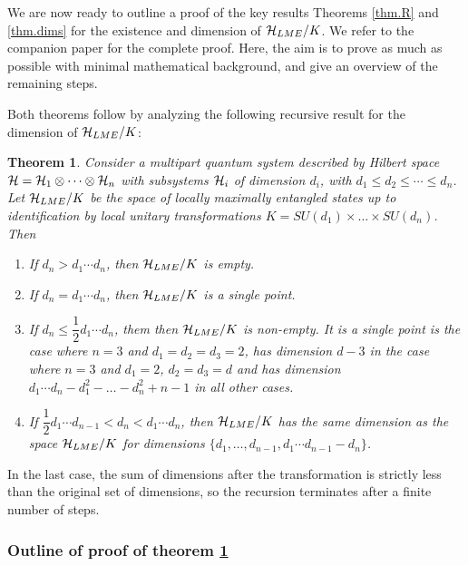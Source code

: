 \documentclass[12pt]{article}
\newtheorem{theorem}{Theorem}[section]
\theoremstyle{definition}
\begin{document}
We are now ready to outline a proof of the key results Theorems \ref{thm.R} and \ref{thm.dims} for the existence and dimension of ${\cal H}_{LME}/K$. We refer to the companion paper \cite{mathpaper} for the complete proof. Here, the aim is to prove as much as possible with minimal mathematical background, and give an overview of the remaining steps.

Both theorems follow by analyzing the following recursive result for the dimension of ${\cal H}_{LME}/K$:

\begin{theorem}\label{thm.States}
Consider a multipart quantum system described by Hilbert space ${\cal H} = {\cal H}_1  \otimes \cdots  \otimes {\cal H}_n$ with subsystems ${\cal H}_i$ of dimension $d_i$, with  $d_1 \le d_2 \leqslant \cdots \leqslant d_n$. Let ${\cal H}_{LME}/K$ be the space of locally maximally entangled states up to identification by local unitary transformations $K = SU(d_1) \times \dots \times SU(d_n)$. Then
\begin{enumerate}

\item
If $d_n > d_1 \cdots d_n$, then ${\cal H}_{LME}/K$ is empty.

\item
If $d_n = d_1 \cdots d_n$, then ${\cal H}_{LME}/K$ is a single point.

\item
If $d_n \le \dfrac{1}{2} d_1 \cdots d_n$, them
then ${\cal H}_{LME}/K$ is non-empty.
It is a single point is the case where $n = 3$ and $d_1 = d_2 = d_3 = 2$,
has dimension $d - 3$ in the case where $n = 3$ and $d_1 = 2$, $d_2 = d_3 = d$
and has dimension $d_1 \cdots d_n -
d_1^2 - \dots - d_n^2 + n - 1$ in all other cases.

\item
If $\dfrac{1}{2} d_1 \cdots d_{n-1} < d_n < d_1 \cdots d_n$,
then ${\cal H}_{LME}/K$ has the same dimension as the space ${\cal H}_{LME}/K$ for dimensions $\{d_1,\dots,d_{n-1}, d_1 \cdots d_{n-1} - d_n\}$.
\end{enumerate}
\end{theorem}
In the last case, the sum of dimensions after the transformation is strictly less than the original set of dimensions, so the recursion terminates after a finite number of steps.

\subsubsection*{Outline of proof of theorem \ref{thm.States}}
\end{document}
